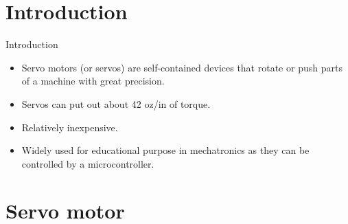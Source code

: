 \documentclass[table,10pt,red]{beamer}	%
\begin{document}
\section{Introduction}
\begin{frame}{Introduction}
	\begin{itemize}
	\item
	Servo motors (or servos) are self-contained devices that rotate or push parts of a machine with great precision.\\
	\item
	Servos can put out about 42 oz/in of torque.
	\item
	Relatively inexpensive.
	\item
	Widely used for educational purpose in mechatronics as they can be controlled by a microcontroller.
	

	\end{itemize}
\end{frame}

\section{Servo motor}
\end{document}
